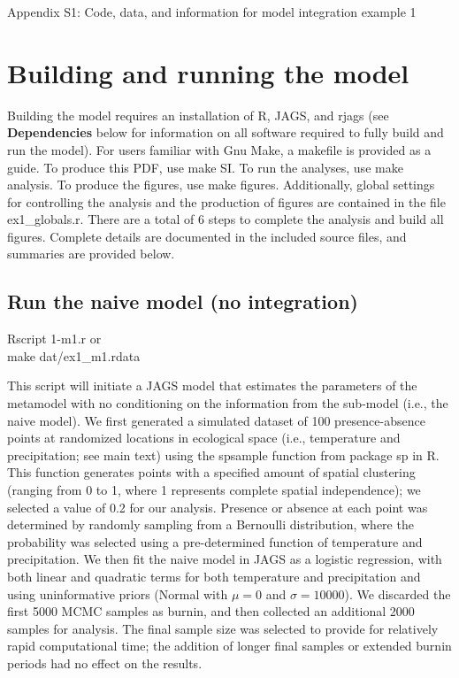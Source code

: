\documentclass[11pt]{article}
\newcommand{\code}[1]{\colorbox{light-gray}{\ttfamily #1}}
\begin{document}
%
%


%
%

{\Large \flushleft
Appendix S1: Code, data, and information for model integration example 1
}

\section{Building and running the model}
Building the model requires an installation of R, JAGS, and rjags (see \textbf{Dependencies} below for information on all software required to fully build and run the model).
For users familiar with Gnu Make, a makefile is provided as a guide.
To produce this PDF, use \code{make SI}. 
To run the analyses, use \code{make analysis}.
To produce the figures, use \code{make figures}.
Additionally, global settings for controlling the analysis and the production of figures are contained in the file \code{ex1\_globals.r}.
There are a total of 6 steps to complete the analysis and build all figures.
Complete details are documented in the included source files, and summaries are provided below.

\subsection{Run the naive model (no integration)}
\code{Rscript 1-m1.r} or \\
\code{make dat/ex1\_m1.rdata}

This script will initiate a JAGS model that estimates the parameters of the metamodel with no conditioning on the information from the sub-model (i.e., the naive model).
We first generated a simulated dataset of 100 presence-absence points at randomized locations in ecological space (i.e., temperature and precipitation; see main text) using the \code{spsample} function from package \code{sp} in R.
This function generates points with a specified amount of spatial clustering (ranging from 0 to 1, where 1 represents complete spatial independence); we selected a value of 0.2 for our analysis.
Presence or absence at each point was determined by randomly sampling from a Bernoulli distribution, where the probability was selected using a pre-determined function of temperature and precipitation.
We then fit the naive model in JAGS as a logistic regression, with both linear and quadratic terms for both temperature and precipitation and using uninformative priors (Normal with \(\mu = 0\) and \(\sigma = 10000\)).
We discarded the first 5000 MCMC samples as burnin, and then collected an additional 2000 samples for analysis.
The final sample size was selected to provide for relatively rapid computational time; the addition of longer final samples or extended burnin periods had no effect on the results.
\end{document}
